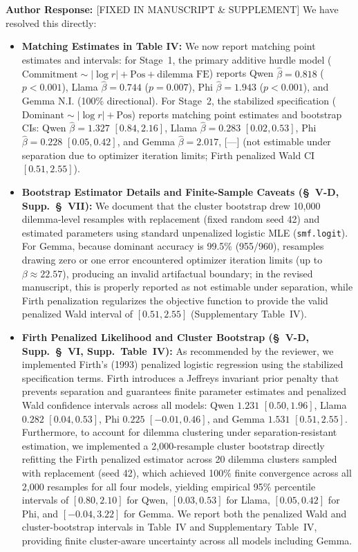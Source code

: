 \documentclass[11pt]{article}
\newcommand{\authorresponse}{\vspace{0.5em}\noindent\textbf{\textcolor{responsecolor}{Author Response: }}}
\begin{document}
\authorresponse [FIXED IN MANUSCRIPT \& SUPPLEMENT] We have resolved this directly:
\begin{itemize}[leftmargin=*]
\item \textbf{Matching Estimates in Table IV:} We now report matching point estimates and intervals: for Stage~1, the primary additive hurdle model ($\text{Commitment} \sim |\log r| + \text{Pos} + \text{dilemma FE}$) reports Qwen $\hat\beta=0.818$ ($p<0.001$), Llama $\hat\beta=0.744$ ($p=0.007$), Phi $\hat\beta=1.943$ ($p<0.001$), and Gemma N.I. (100\% directional). For Stage~2, the stabilized specification ($\text{Dominant} \sim |\log r| + \text{Pos}$) reports matching point estimates and bootstrap CIs: Qwen $\hat\beta=1.327$ $[0.84, 2.16]$, Llama $\hat\beta=0.283$ $[0.02, 0.53]$, Phi $\hat\beta=0.228$ $[0.05, 0.42]$, and Gemma $\hat\beta=2.017$, [---] (not estimable under separation due to optimizer iteration limits; Firth penalized Wald CI $[0.51, 2.55]$).
\item \textbf{Bootstrap Estimator Details and Finite-Sample Caveats (\S~V-D, Supp.~\S~VII):} We document that the cluster bootstrap drew 10,000 dilemma-level resamples with replacement (fixed random seed 42) and estimated parameters using standard unpenalized logistic MLE (\texttt{smf.logit}). For Gemma, because dominant accuracy is 99.5\% (955/960), resamples drawing zero or one error encountered optimizer iteration limits (up to $\beta \approx 22.57$), producing an invalid artifactual boundary; in the revised manuscript, this is properly reported as not estimable under separation, while Firth penalization regularizes the objective function to provide the valid penalized Wald interval of $[0.51, 2.55]$ (Supplementary Table~IV).
\item \textbf{Firth Penalized Likelihood and Cluster Bootstrap (\S~V-D, Supp.~\S~VI, Supp.~Table~IV):} As recommended by the reviewer, we implemented Firth's (1993) penalized logistic regression using the stabilized specification terms. Firth introduces a Jeffreys invariant prior penalty that prevents separation and guarantees finite parameter estimates and penalized Wald confidence intervals across all models: Qwen $1.231$ $[0.50, 1.96]$, Llama $0.282$ $[0.04, 0.53]$, Phi $0.225$ $[-0.01, 0.46]$, and Gemma $1.531$ $[0.51, 2.55]$. Furthermore, to account for dilemma clustering under separation-resistant estimation, we implemented a 2,000-resample cluster bootstrap directly refitting the Firth penalized estimator across 20 dilemma clusters sampled with replacement (seed 42), which achieved 100\% finite convergence across all 2,000 resamples for all four models, yielding empirical 95\% percentile intervals of $[0.80, 2.10]$ for Qwen, $[0.03, 0.53]$ for Llama, $[0.05, 0.42]$ for Phi, and $[-0.04, 3.22]$ for Gemma. We report both the penalized Wald and cluster-bootstrap intervals in Table~IV and Supplementary Table~IV, providing finite cluster-aware uncertainty across all models including Gemma.
\end{itemize}
\end{document}
